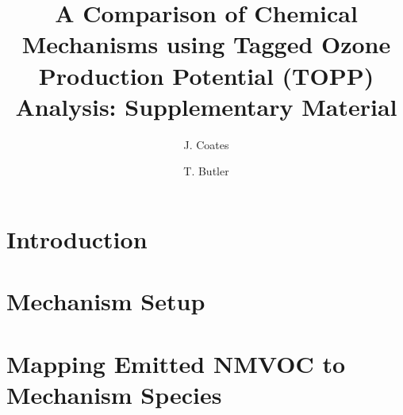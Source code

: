 \documentclass[11pt,a4paper]{article}
\title{A Comparison of Chemical Mechanisms using Tagged Ozone Production Potential (TOPP) Analysis: Supplementary Material}
\author[1]{J. Coates}%
\author[1]{T. Butler}
\affil[1]{Institute for Advanced Sustainability Studies, Potsdam, Germany}
\begin{document}
\maketitle

\section{Introduction} \label{s:introduction}


\section{Mechanism Setup} \label{s:mechanism}


\section{Mapping Emitted NMVOC to Mechanism Species}

\newpage

%
%

 
\end{document}
